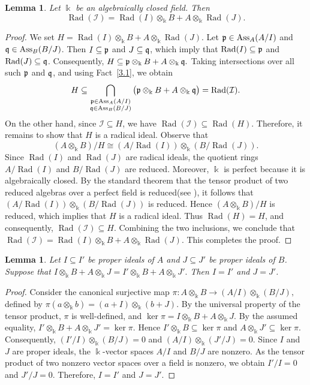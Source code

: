 \documentclass[10pt,a4paper]{amsart}
\numberwithin{equation}{theorem}
\newtheorem{lemma}[theorem]{Lemma}
\theoremstyle{definition}
\theoremstyle{fact}
\theoremstyle{conjecture}
\newcommand{\Ass}{\operatorname{Ass}}
\newcommand{\Rad}{\operatorname{Rad}}
\newcommand{\fp}{\frak{p}}
\newcommand{\fq}{\frak{q}}
\begin{document}
\begin{lemma}\label{3.2}
Let $\Bbbk$ be an algebraically closed field. Then
\[
\Rad(\mathcal{I})
= \Rad(I) \otimes_\Bbbk B + A \otimes_\Bbbk \Rad(J).
\]
\end{lemma}
\begin{proof}
We set
$
H=\Rad(I)\otimes_\Bbbk B+A\otimes_\Bbbk\Rad(J).
$
Let $\fp\in\Ass_A(A/I)$ and $\fq\in\Ass_B(B/J)$. Then
$I\subseteq\fp$ and $J\subseteq\fq$, which imply that
$\Rad(I)\subseteq\fp$ and $\Rad(J)\subseteq\fq$. Consequently,
$
H\subseteq \fp\otimes_\Bbbk B+A\otimes_\Bbbk\fq.
$
Taking intersections over all such $\fp$ and $\fq$, and using
Fact~\ref{3.1}, we obtain
\[
H\subseteq \bigcap_{\substack{\fp \in \Ass_A(A/I) \\ \fq \in \Ass_B(B/J)}}
  \big(\fp \otimes_\Bbbk B + A \otimes_\Bbbk \fq\big)=\Rad(\mathcal I).
\]
%
On the other hand, since $\mathcal I\subseteq H$, we have
$
\Rad(\mathcal I)\subseteq\Rad(H).
$
Therefore, it remains to show that $H$ is a radical ideal.
Observe that
\[
(A\otimes_\Bbbk B)/H
\cong
(A/\Rad(I))
\otimes_\Bbbk
(B/\Rad(J)).
\]
Since $\Rad(I)$ and $\Rad(J)$ are radical ideals, the quotient
rings $A/\Rad(I)$ and $B/\Rad(J)$ are reduced. Moreover,
$\Bbbk$ is perfect because it is algebraically closed. By the
standard theorem that the tensor product of two reduced algebras
over a perfect field is reduced(see \cite{B}), it follows that
$
(A/\Rad(I))
\otimes_\Bbbk
(B/\Rad(J))
$
is reduced. Hence $(A\otimes_\Bbbk B)/H$ is reduced, which
implies that $H$ is a radical ideal. Thus $\Rad(H)=H$, and
consequently,
$
\Rad(\mathcal I)\subseteq H.
$
Combining the two inclusions, we conclude that
$
\Rad(\mathcal I)
=\Rad(I)\otimes_\Bbbk B
+A\otimes_\Bbbk\Rad(J).
$
This completes the proof.
\end{proof}



\begin{lemma}
\label{3.3}
Let $I\subseteq I'$ be proper ideals of $A$ and
$J\subseteq J'$ be proper ideals of $B$. Suppose that
$
I\otimes_\Bbbk B+A\otimes_\Bbbk J
=
I'\otimes_\Bbbk B+A\otimes_\Bbbk J'.
$
Then $I=I'$ and $J=J'$.
\end{lemma}

\begin{proof}
Consider the canonical surjective map
$
\pi:A\otimes_\Bbbk B
\longrightarrow
(A/I)\otimes_\Bbbk(B/J),
$
defined by
$
\pi(a\otimes_\Bbbk b)
=(a+I)\otimes_\Bbbk(b+J).
$
By the universal property of the tensor product, $\pi$ is
well-defined, and
$
\ker\pi=I\otimes_\Bbbk B+A\otimes_\Bbbk J.
$
By the assumed equality,
$
I'\otimes_\Bbbk B+A\otimes_\Bbbk J'
=\ker\pi.
$
Hence
$I'\otimes_\Bbbk B\subseteq\ker\pi$ and $A\otimes_\Bbbk J'\subseteq\ker\pi$.
Consequently,
$
(I'/I)\otimes_\Bbbk(B/J)=0$ and $(A/I)\otimes_\Bbbk(J'/J)=0$.
Since $I$ and $J$ are proper ideals, the $\Bbbk$-vector spaces
$A/I$ and $B/J$ are nonzero. As the tensor product of two
nonzero vector spaces over a field is nonzero, we obtain
$I'/I=0$ and  $J'/J=0$.
Therefore, $I=I'$ and $J=J'$.
\end{proof}
\end{document}
